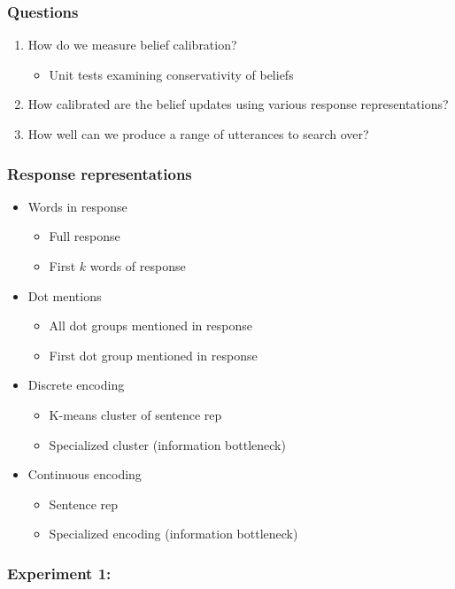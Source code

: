 \documentclass{beamer}
\begin{document}
\begin{frame}
\frametitle{Questions}
\begin{enumerate}
\item How do we measure belief calibration?
    \begin{itemize}
    \item Unit tests examining conservativity of beliefs
    \end{itemize}
\item How calibrated are the belief updates using various response representations?
\item How well can we produce a range of utterances to search over?
\end{enumerate}
\end{frame}

\begin{frame}
\frametitle{Response representations}
\begin{itemize}
\item Words in response
    \begin{itemize}
    \item Full response
    \item First $k$ words of response
    \end{itemize}
\item Dot mentions
    \begin{itemize}
    \item All dot groups mentioned in response
    \item First dot group mentioned in response
    \end{itemize}
\item Discrete encoding
    \begin{itemize}
    \item K-means cluster of sentence rep
    \item Specialized cluster (information bottleneck)
    \end{itemize}
\item Continuous encoding
    \begin{itemize}
    \item Sentence rep
    \item Specialized encoding (information bottleneck)
    \end{itemize}
\end{itemize}
\end{frame}

\begin{frame}
\frametitle{Experiment 1: }
\end{frame}
\end{document}

